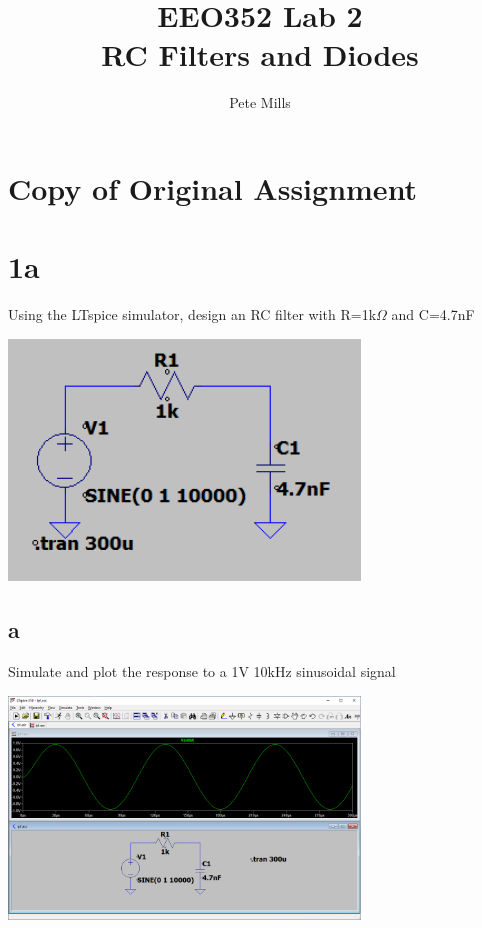 \documentclass{article}
\begin{document}
	
	
	\title{EEO352 Lab 2\\RC Filters and Diodes}
	\author{Pete Mills}
	
	\maketitle
	
	\section*{Copy of Original Assignment}
	
	
	
	\section*{1a}
	
	Using the LTspice simulator, design an RC filter with R=1k\(\Omega\) and C=4.7nF 
	
	\begin{center}
	\includegraphics[width=0.7\textwidth]{lpf}
	\end{center}
	
	\subsection*{a}
	
	Simulate and plot the response to a 1V 10kHz sinusoidal signal
	
	\begin{center}
	\includegraphics[width=0.7\textwidth]{1v10k}
	\end{center}
	
\end{document}
